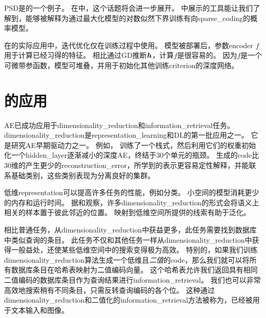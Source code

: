 \gls{PSD}是的一个例子。
在中，这个话题将会进一步展开。
中展示的工具能让我们了解到，能够被解释为通过最大化模型的对数似然下界训练有向\gls{sparse_coding}的概率模型。


在的实际应用中，迭代优化仅在训练过程中使用。
模型被部署后，参数\gls{encoder} $f$用于计算已经习得的特征。
相比通过\gls{GD}推断$\boldsymbol{\mathit{h}}$，计算$f$是很容易的。
因为$f$是一个可微带参函数，模型可堆叠，并用于初始化其他训练\gls{criterion}的深度网络。


\section{的应用}
\label{sec:applications_of_autoencoders}

\gls{AE}已成功应用于\gls{dimensionality_reduction}和\gls{information_retrieval}任务。
\gls{dimensionality_reduction}是\gls{representation_learning}和\gls{DL}的第一批应用之一。
它是研究\gls{AE}早期驱动力之一。
例如， \citet{Hinton-Science2006}训练了一个栈式，然后利用它们的权重初始化一个\gls{hidden_layer}逐渐减小的深度\gls{AE}，终结于30个单元的瓶颈。
生成的\gls{code}比30维的产生更少的\gls{reconstruction_error}，所学到的表示更容易定性解释，并能联系基础类别，这些类别表现为分离良好的集群。


低维\gls{representation}可以提高许多任务的性能，例如分类。
小空间的模型消耗更少的内存和运行时间。
据\citet{Salakhutdinov+Hinton2007-small}和\citet{Torralba+Fergus+Weiss-2008}观察，许多\gls{dimensionality_reduction}的形式会将语义上相关的样本置于彼此邻近的位置。
映射到低维空间所提供的线索有助于泛化。


相比普通任务，从\gls{dimensionality_reduction}中获益更多，此任务需要找到数据库中类似查询的条目。
此任务不仅和其他任务一样从\gls{dimensionality_reduction}中获得一般益处，还使某些低维空间中的搜索变得极为高效。
特别的，如果我们训练\gls{dimensionality_reduction}算法生成一个低维且\emph{二值}的\gls{code}，那么我们就可以将所有数据库条目在哈希表映射为二值编码向量。
这个哈希表允许我们返回具有相同二值编码的数据库条目作为查询结果进行\gls{information_retrieval}。
我们也可以非常高效地搜索稍有不同条目，只需反转查询编码的各个位。
这种通过\gls{dimensionality_reduction}和二值化的\gls{information_retrieval}方法被称为\citep{Salakhutdinov+Hinton2007-small,Salakhutdinov+Geoff-2009}，已经被用于文本输入\citep{Salakhutdinov+Hinton2007-small,Salakhutdinov+Geoff-2009}和图像\citep{Torralba+Fergus+Weiss-2008,WeissTF08,KrizhevskyH11}。


